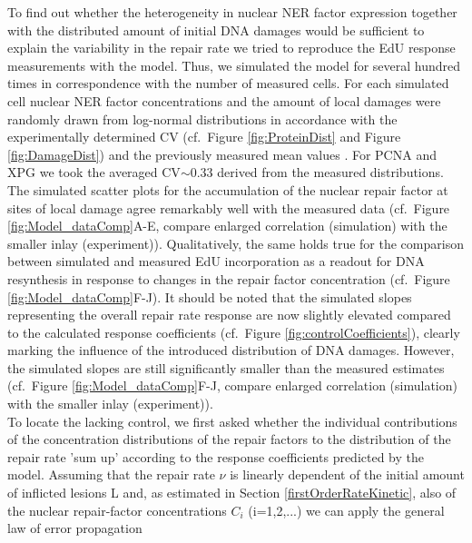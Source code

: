 To find out whether the heterogeneity in nuclear NER factor expression together with the distributed amount of initial DNA damages would be sufficient to explain the variability in the repair rate we tried to reproduce the EdU response measurements with the model. Thus, we simulated the model for several hundred times in correspondence with the number of measured cells. For each simulated cell nuclear NER factor concentrations and the amount of local damages were randomly drawn from log-normal distributions in accordance with the experimentally determined CV (cf.\ Figure \ref{fig:ProteinDist} and Figure \ref{fig:DamageDist}) and the previously measured mean values \cite{Luijsterburg2010}. For PCNA and XPG we took the averaged CV$\sim$0.33 derived from the measured distributions. The simulated scatter plots for the accumulation of the nuclear repair factor at sites of local damage agree remarkably well with the measured data (cf.\ Figure \ref{fig:Model_dataComp}A-E, compare enlarged correlation (simulation) with the smaller inlay (experiment)). Qualitatively, the same holds true for the comparison between simulated and measured EdU incorporation as a readout for DNA resynthesis in response to changes in the repair factor concentration (cf.\ Figure \ref{fig:Model_dataComp}F-J). It should be noted that the simulated slopes representing the overall repair rate response are now slightly elevated compared to the calculated response coefficients (cf.\ Figure \ref{fig:controlCoefficients}), clearly marking the influence of the introduced distribution of DNA damages. However, the simulated slopes are still significantly smaller than the measured estimates (cf.\ Figure \ref{fig:Model_dataComp}F-J, compare enlarged correlation (simulation) with the smaller inlay (experiment)).\\    
To locate the lacking control, we first asked whether the individual contributions of the concentration distributions of the repair factors to the distribution of the repair rate 'sum up' according to the response coefficients predicted by the model. Assuming that the repair rate $\nu$ is linearly dependent of the initial amount of inflicted lesions L and, as estimated in Section \ref{firstOrderRateKinetic}, also of the nuclear repair-factor concentrations $C_i$ (i=1,2,...) we can apply the general law of error propagation

